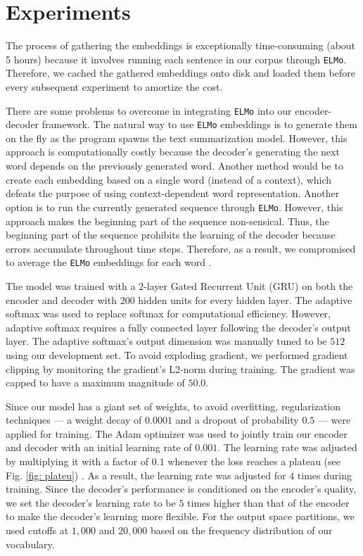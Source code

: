 \section{Experiments}
\label{sec: exp}

The process of gathering the embeddings is exceptionally time-consuming (about 5 hours) because it involves running each sentence in our corpus through \texttt{ELMo}. Therefore, we cached the gathered embeddings onto disk and loaded them before every subsequent experiment to amortize the cost. 

There are some problems to overcome in integrating \texttt{ELMo} into our encoder-decoder framework. The natural way to use \texttt{ELMo} embeddings is to generate them on the fly as the program spawns the text summarization model. However, this approach is computationally costly because the decoder's generating the next word depends on the previously generated word. Another method would be to create each embedding based on a single word (instead of a context), which defeats the purpose of using context-dependent word representation. Another option is to run the currently generated sequence through \texttt{ELMo}. However, this approach makes the beginning part of the sequence non-sensical. Thus, the beginning part of the sequence prohibits the learning of the decoder because errors accumulate throughout time steps.
Therefore, as a result, we compromised to average the \texttt{ELMo} embeddings for each word .

The model was trained with a 2-layer Gated Recurrent Unit (GRU) on both the encoder and decoder with $200$ hidden units for every hidden layer. The adaptive softmax was used to replace softmax for computational efficiency. However, adaptive softmax requires a fully connected layer following the decoder's output layer.  The adaptive softmax's output dimension was manually tuned to be $512$ using our development set. To avoid exploding gradient, we performed gradient clipping by monitoring the gradient's L2-norm during training. The gradient was capped to have a maximum magnitude of $50.0$.

Since our model has a giant set of weights, to avoid overfitting, regularization techniques --- a weight decay of $0.0001$ and a dropout of probability $0.5$ --- were applied for training. The Adam optimizer \cite{kingma2014adam} was used to jointly train  our encoder and decoder with an initial learning rate of $0.001$. The learning rate was adjusted by multiplying it with a factor of $0.1$ whenever the loss reaches a plateau (see Fig. \ref{fig: plateu}) . As a result, the learning rate was adjusted for $4$ times during training. Since the decoder's performance is conditioned on the encoder's quality, we set the decoder's learning rate to be $5$ times higher than that of the encoder to make the decoder's learning more flexible. For the output space partitions, we used cutoffs at $1,000$ and $20,000$ based on the frequency distribution of our vocabulary.    

